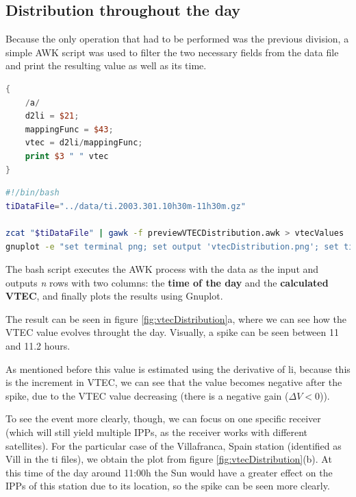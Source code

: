 \subsection{Distribution throughout the day}

Because the only operation that had to be performed was the previous division, a simple AWK script was used to filter the two necessary fields from the data file and print the resulting value as well as its time. 

\begin{minipage}{\linewidth}
\begin{lstlisting}[language=Awk, caption=AWK script to estimate the VTEC]
{
	/a/
	d2li = $21;
	mappingFunc = $43;
	vtec = d2li/mappingFunc;
	print $3 " " vtec
}
\end{lstlisting}
\end{minipage}

\begin{minipage}{\linewidth}
\begin{lstlisting}[language=Bash, caption=Bash script to execute the procedures]
#!/bin/bash
tiDataFile="../data/ti.2003.301.10h30m-11h30m.gz"

zcat "$tiDataFile" | gawk -f previewVTECDistribution.awk > vtecValues
gnuplot -e "set terminal png; set output 'vtecDistribution.png'; set title 'VTEC Distribution'; set xlabel 'Time of the day (hours)'; set ylabel 'VTEC'; set grid; plot \"vtecValues\" using 1:2 with point"
\end{lstlisting}
\end{minipage}


The bash script executes the AWK process with the data as the input and outputs \textit{n} rows with two columns: the \textbf{time of the day} and the \textbf{calculated VTEC}, and finally plots the results using Gnuplot. 

The result can be seen in figure \ref{fig:vtecDistribution}a, where we can see how the VTEC value evolves throught the day. Visually, a spike can be seen between 11 and 11.2 hours. 

As mentioned before this value is estimated using the derivative of li, because this is the increment in VTEC, we can see that the value becomes negative after the spike, due to the VTEC value decreasing (there is a negative gain ($\Delta V < 0$)).

To see the event more clearly, though, we can focus on one specific receiver (which will still yield multiple IPPs, as the receiver works with different satellites). For the particular case of the Villafranca, Spain station (identified as Vill in the ti files), we obtain the plot from figure \ref{fig:vtecDistribution}(b). At this time of the day around 11:00h the Sun would have a greater effect on the IPPs of this station due to its location, so the spike can be seen more clearly. 


